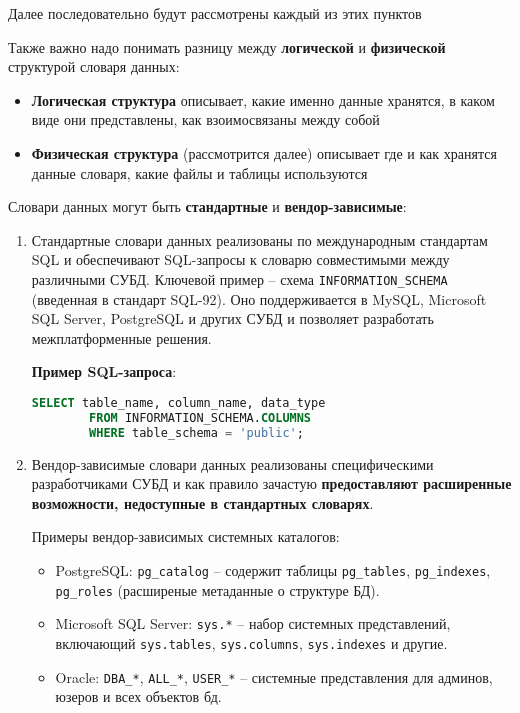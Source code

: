 Далее последовательно будут рассмотрены каждый из этих пунктов

Также важно надо понимать разницу между \textbf{логической} и \textbf{физической} структурой словаря данных:

\begin{itemize}
    \item \textbf{Логическая структура} описывает, какие именно данные хранятся, в каком виде они представлены, как взоимосвязаны между собой
    \item \textbf{Физическая структура} (рассмотрится далее) описывает где и как хранятся данные словаря, какие файлы и таблицы используются
\end{itemize}

Словари данных могут быть \textbf{стандартные} и \textbf{вендор-зависимые}:

\begin{enumerate}
 
    \item Стандартные словари данных реализованы по международным стандартам SQL и обеспечивают SQL-запросы к словарю совместимыми между различными СУБД. Ключевой пример – схема \texttt{INFORMATION\_SCHEMA} (введенная в стандарт SQL-92). Оно поддерживается в MySQL, Microsoft SQL Server, PostgreSQL и других СУБД и позволяет разработать межплатформенные решения.

        \textbf{Пример SQL-запроса}:
        \begin{lstlisting}[language=SQL]
        SELECT table_name, column_name, data_type 
        FROM INFORMATION_SCHEMA.COLUMNS 
        WHERE table_schema = 'public';
        \end{lstlisting}

    \item Вендор-зависимые словари данных реализованы специфическими разработчиками СУБД и как правило зачастую \textbf{предоставляют расширенные возможности, недоступные в стандартных словарях}. 

    Примеры вендор-зависимых системных каталогов:
    \begin{itemize}
        \item PostgreSQL: \texttt{pg\_catalog} – содержит таблицы \texttt{pg\_tables}, \texttt{pg\_indexes}, \texttt{pg\_roles} (расширеные метаданные о структуре БД).
        \item Microsoft SQL Server: \texttt{sys.*} – набор системных представлений, включающий \texttt{sys.tables}, \texttt{sys.columns}, \texttt{sys.indexes} и другие.
        \item Oracle: \texttt{DBA\_*}, \texttt{ALL\_*}, \texttt{USER\_*} – системные представления для админов, юзеров и всех объектов бд.
    \end{itemize}

\end{enumerate}

